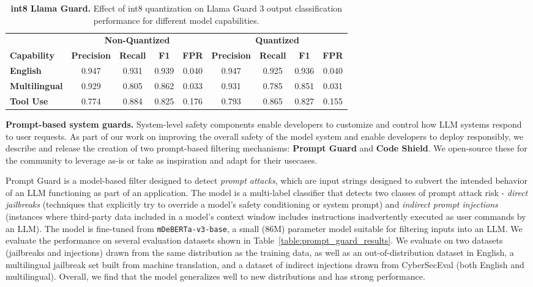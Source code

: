 \begin{table}
\centering
    \begin{tabular}{lcccccccc}
    \toprule
   & \multicolumn{4}{c}{\textbf{Non-Quantized}} & \multicolumn{4}{c}{\textbf{Quantized}} \\
      \textbf{Capability} & \textbf{Precision} & \textbf{Recall} & \textbf{F1} & \textbf{FPR} & \textbf{Precision} & \textbf{Recall} & \textbf{F1} & \textbf{FPR} \\
    \midrule
    \textbf{English} & 0.947 & 0.931 & 0.939 & 0.040 & 0.947 & 0.925 & 0.936 & 0.040 \\
    \textbf{Multilingual} & 0.929 & 0.805 & 0.862 & 0.033 & 0.931 & 0.785 & 0.851 & 0.031 \\
    \textbf{Tool Use} & 0.774 & 0.884 & 0.825 & 0.176 & 0.793 & 0.865 & 0.827 & 0.155 \\
    \bottomrule
    \end{tabular}
    \caption{\textbf{int8 Llama Guard.} Effect of int8 quantization on Llama Guard 3 output classification performance for different model capabilities.}
    \label{table:quantization_with_sls}
\end{table}

\textbf{Prompt-based system guards.}
System-level safety components enable developers to customize and control how LLM systems respond to user requests. 
As part of our work on improving the overall safety of the model system and enable developers to deploy responsibly, we describe and release the creation of two prompt-based filtering mechanisms: \textbf{Prompt Guard} and \textbf{Code Shield}.
We open-source these for the community to leverage as-is or take as inspiration and adapt for their usecases. 

Prompt Guard is a model-based filter designed to detect \textit{prompt attacks}, which are input strings designed to subvert the intended behavior of an LLM functioning as part of an application. The model is a multi-label classifier that detects two classes of prompt attack risk - \textit{direct jailbreaks} (techniques that explicitly try to override a model's safety conditioning or system prompt) and \textit{indirect prompt injections} (instances where third-party data included in a model's context window includes instructions inadvertently executed as user commands by an LLM). The model is fine-tuned from \texttt{mDeBERTa-v3-base}, a small (86M) parameter model suitable for filtering inputs into an LLM. We evaluate the performance on several evaluation datasets shown in Table~\ref{table:prompt_guard_results}. We evaluate on two datasets (jailbreaks and injections) drawn from the same distribution as the training data, as well as an out-of-distribution dataset in English, a multilingual jailbreak set built from machine translation, and a dataset of indirect injections drawn from CyberSecEval (both English and multilingual). Overall, we find that the model generalizes well to new distributions and has strong performance. 

